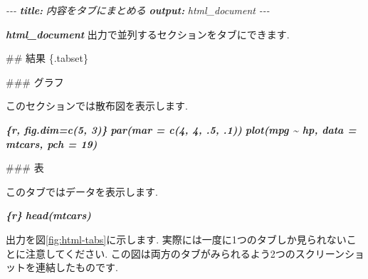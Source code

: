 \documentclass[
  11pt,
]{bxjsreport}
\newenvironment{Shaded}{\begin{snugshade}}{\end{snugshade}}
\newcommand{\AnnotationTok}[1]{\textcolor[rgb]{0.56,0.35,0.01}{\textbf{\textit{#1}}}}
\newcommand{\CommentTok}[1]{\textcolor[rgb]{0.56,0.35,0.01}{\textit{#1}}}
\newcommand{\FunctionTok}[1]{\textcolor[rgb]{0.00,0.00,0.00}{#1}}
\newcommand{\InformationTok}[1]{\textcolor[rgb]{0.56,0.35,0.01}{\textbf{\textit{#1}}}}
\newcommand{\NormalTok}[1]{#1}
\begin{document}
\begin{Shaded}
\begin{Highlighting}[]
\CommentTok{{-}{-}{-}}
\AnnotationTok{title:}\CommentTok{ 内容をタブにまとめる}
\AnnotationTok{output:}\CommentTok{ html\_document}
\CommentTok{{-}{-}{-}}

\InformationTok{\textasciigrave{}html\_document\textasciigrave{}}\NormalTok{ 出力で並列するセクションをタブにできます.}

\FunctionTok{\#\# 結果 \{.tabset\}}

\FunctionTok{\#\#\# グラフ}

\NormalTok{このセクションでは散布図を表示します.}

\InformationTok{\textasciigrave{}\textasciigrave{}\textasciigrave{}\{r, fig.dim=c(5, 3)\}}
\InformationTok{par(mar = c(4, 4, .5, .1))}
\InformationTok{plot(mpg \textasciitilde{} hp, data = mtcars, pch = 19)}
\InformationTok{\textasciigrave{}\textasciigrave{}\textasciigrave{}}

\FunctionTok{\#\#\# 表}

\NormalTok{このタブではデータを表示します.}

\InformationTok{\textasciigrave{}\textasciigrave{}\textasciigrave{}\{r\}}
\InformationTok{head(mtcars)}
\InformationTok{\textasciigrave{}\textasciigrave{}\textasciigrave{}}
\end{Highlighting}
\end{Shaded}

出力を図\ref{fig:html-tabs}に示します. 実際には一度に1つのタブしか見られないことに注意してください. この図は両方のタブがみられるよう2つのスクリーンショットを連結したものです.
\end{document}
